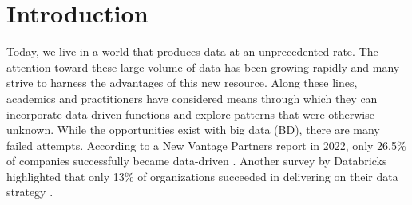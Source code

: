 \documentclass{bmcart}
\begin{document}
\begin{frontmatter}
\begin{abstractbox}

\begin{keyword}
\end{keyword}


\end{abstractbox}
%

\end{frontmatter}




\section{Introduction}


Today, we live in a world that produces data at an unprecedented rate. The attention toward these large volume of data has been growing rapidly and many strive to harness the advantages of this new resource. Along these lines, academics and practitioners have considered means through which they can incorporate data-driven functions and explore patterns that were otherwise unknown. While the opportunities exist with big data (BD), there are many failed attempts. According to a New Vantage Partners report in 2022, only 26.5\% of companies successfully became data-driven \cite{NewVantageSurvey}. Another survey by Databricks highlighted that only 13\% of organizations succeeded in delivering on their data strategy \cite{DataBricksSurvey}. 
\end{document}
